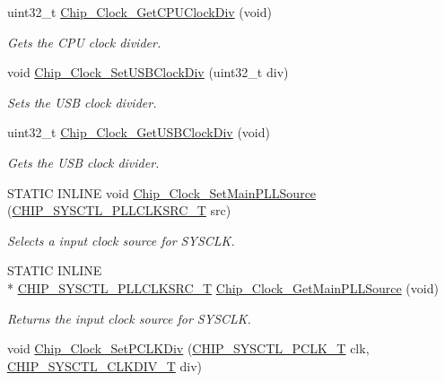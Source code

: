 \begin{DoxyCompactItemize}
uint32\+\_\+t \hyperlink{group___c_l_o_c_k__17_x_x__40_x_x_ga3e1ef8ac1f9c19b33016c914b01fd9a4}{Chip\+\_\+\+Clock\+\_\+\+Get\+C\+P\+U\+Clock\+Div} (void)
\begin{DoxyCompactList}\small\item\em Gets the C\+P\+U clock divider. \end{DoxyCompactList}\item 
void \hyperlink{group___c_l_o_c_k__17_x_x__40_x_x_gae63a884704ec0b314373e34165f62963}{Chip\+\_\+\+Clock\+\_\+\+Set\+U\+S\+B\+Clock\+Div} (uint32\+\_\+t div)
\begin{DoxyCompactList}\small\item\em Sets the U\+S\+B clock divider. \end{DoxyCompactList}\item 
uint32\+\_\+t \hyperlink{group___c_l_o_c_k__17_x_x__40_x_x_ga5852bdb5470a03988aaae8c68e3fb5fd}{Chip\+\_\+\+Clock\+\_\+\+Get\+U\+S\+B\+Clock\+Div} (void)
\begin{DoxyCompactList}\small\item\em Gets the U\+S\+B clock divider. \end{DoxyCompactList}\item 
S\+T\+A\+T\+I\+C I\+N\+L\+I\+N\+E void \hyperlink{group___c_l_o_c_k__17_x_x__40_x_x_gadeba4ec298c7ad2cf1627f9add199d02}{Chip\+\_\+\+Clock\+\_\+\+Set\+Main\+P\+L\+L\+Source} (\hyperlink{group___c_l_o_c_k__17_x_x__40_x_x_gacda7fd6d13922330ce9344dbc4ec85b7}{C\+H\+I\+P\+\_\+\+S\+Y\+S\+C\+T\+L\+\_\+\+P\+L\+L\+C\+L\+K\+S\+R\+C\+\_\+\+T} src)
\begin{DoxyCompactList}\small\item\em Selects a input clock source for S\+Y\+S\+C\+L\+K. \end{DoxyCompactList}\item 
S\+T\+A\+T\+I\+C I\+N\+L\+I\+N\+E \\*
\hyperlink{group___c_l_o_c_k__17_x_x__40_x_x_gacda7fd6d13922330ce9344dbc4ec85b7}{C\+H\+I\+P\+\_\+\+S\+Y\+S\+C\+T\+L\+\_\+\+P\+L\+L\+C\+L\+K\+S\+R\+C\+\_\+\+T} \hyperlink{group___c_l_o_c_k__17_x_x__40_x_x_gaf678411ef6cde49c95c603030554fa9d}{Chip\+\_\+\+Clock\+\_\+\+Get\+Main\+P\+L\+L\+Source} (void)
\begin{DoxyCompactList}\small\item\em Returns the input clock source for S\+Y\+S\+C\+L\+K. \end{DoxyCompactList}\item 
void \hyperlink{group___c_l_o_c_k__17_x_x__40_x_x_gab218e9b1ee5377bd662e516420e863ea}{Chip\+\_\+\+Clock\+\_\+\+Set\+P\+C\+L\+K\+Div} (\hyperlink{group___c_l_o_c_k__17_x_x__40_x_x_ga7af78c5752bdd11a908ec9b11e2ecffc}{C\+H\+I\+P\+\_\+\+S\+Y\+S\+C\+T\+L\+\_\+\+P\+C\+L\+K\+\_\+\+T} clk, \hyperlink{group___c_l_o_c_k__17_x_x__40_x_x_gab4cd58034824b8c55c223a280dbe4f5f}{C\+H\+I\+P\+\_\+\+S\+Y\+S\+C\+T\+L\+\_\+\+C\+L\+K\+D\+I\+V\+\_\+\+T} div)

\end{DoxyCompactItemize}
